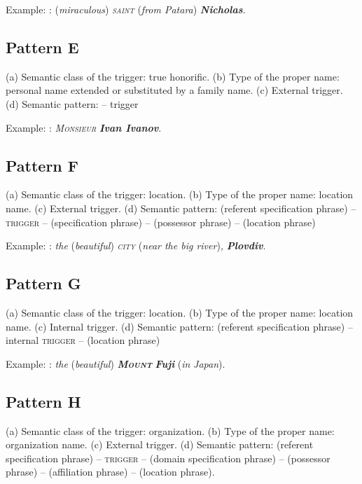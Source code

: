 \documentclass[output=paper]{langsci/langscibook}
\newcommand{\trigger}[1]{\textsc{#1}}
\begin{document}
\medskip 


Example: : (\textit{miraculous}) \textit{\trigger{saint}}\textit{
}(\textit{from Patara})\textit{ }\textbf{\textit{Nicholas}}.


\subsection{Pattern E}

(a) Semantic class of the trigger: true honorific. (b) Type of the
proper name: personal name extended or substituted by a family name.
(c) External trigger. (d) Semantic pattern: – trigger 

\medskip 

Example: :
\textit{\trigger{Monsieur}}\textit{ }\textbf{\textit{Ivan Ivanov}}.

\subsection{Pattern F}

(a) Semantic class of the trigger: location. (b) Type of the proper
name: location name. (c) External trigger. (d) Semantic pattern:
(referent specification phrase) – \trigger{trigger} – (specification
phrase) – (possessor phrase) – (location phrase)

\medskip 


Example: : \textit{the }(\textit{beautiful})\textit{
}\textit{\trigger{city}} (\textit{near the big river})\textit{,}
\textbf{\textit{Plovdiv}}.

\subsection{Pattern G}


(a) Semantic class of the trigger: location. (b) Type of the proper
name: location name. (c) Internal trigger. (d) Semantic pattern:
(referent specification phrase) – internal \trigger{trigger} – (location
phrase)


\medskip 

Example: : \textit{the }(\textit{beautiful})
\textbf{\textit{\trigger{Mount}}}\textbf{\textit{ Fuji}}
(\textit{in}\textit{ Japan}).

\subsection{Pattern H}


(a) Semantic class of the trigger: organization. (b) Type of the proper
name: organization name. (c) External trigger. (d) Semantic pattern:
(referent specification phrase) – \trigger{trigger} – (domain
specification phrase) – (possessor phrase) – (affiliation phrase) –
(location phrase).
\end{document}
